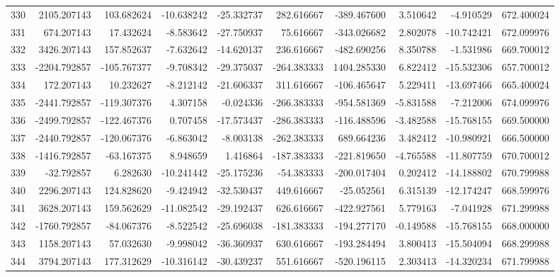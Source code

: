 \begin{tabular}{lrrrrrrrrr}
330 &   2105.207143 &   103.682624 & -10.638242 & -25.332737 &   282.616667 &  -389.467600 &   3.510642 &  -4.910529 &  672.400024 \\
331 &    674.207143 &    17.432624 &  -8.583642 & -27.750937 &    75.616667 &  -343.026682 &   2.802078 & -10.742421 &  672.099976 \\
332 &   3426.207143 &   157.852637 &  -7.632642 & -14.620137 &   236.616667 &  -482.690256 &   8.350788 &  -1.531986 &  669.700012 \\
333 &  -2204.792857 &  -105.767377 &  -9.708342 & -29.375037 &  -264.383333 &  1404.285330 &   6.822412 & -15.532306 &  657.700012 \\
334 &    172.207143 &    10.232627 &  -8.212142 & -21.606337 &   311.616667 &  -106.465647 &   5.229411 & -13.697466 &  665.400024 \\
335 &  -2441.792857 &  -119.307376 &   4.307158 &  -0.024336 &  -266.383333 &  -954.581369 &  -5.831588 &  -7.212006 &  674.099976 \\
336 &  -2499.792857 &  -122.467376 &   0.707458 & -17.573437 &  -286.383333 &  -116.488596 &  -3.482588 & -15.768155 &  669.500000 \\
337 &  -2440.792857 &  -120.067376 &  -6.863042 &  -8.003138 &  -262.383333 &   689.664236 &   3.482412 & -10.980921 &  666.500000 \\
338 &  -1416.792857 &   -63.167375 &   8.948659 &   1.416864 &  -187.383333 &  -221.819650 &  -4.765588 & -11.807759 &  670.700012 \\
339 &    -32.792857 &     6.282630 & -10.241442 & -25.175236 &   -54.383333 &  -200.017404 &   0.202412 & -14.188802 &  670.799988 \\
340 &   2296.207143 &   124.828620 &  -9.424942 & -32.530437 &   449.616667 &   -25.052561 &   6.315139 & -12.174247 &  668.599976 \\
341 &   3628.207143 &   159.562629 & -11.082542 & -29.192437 &   626.616667 &  -422.927561 &   5.779163 &  -7.041928 &  671.299988 \\
342 &  -1760.792857 &   -84.067376 &  -8.522542 & -25.696038 &  -181.383333 &  -194.277170 &  -0.149588 & -15.768155 &  668.000000 \\
343 &   1158.207143 &    57.032630 &  -9.998042 & -36.360937 &   630.616667 &  -193.284494 &   3.800413 & -15.504094 &  668.299988 \\
344 &   3794.207143 &   177.312629 & -10.316142 & -30.439237 &   551.616667 &  -520.196115 &   2.303413 & -14.320234 &  671.799988 \\

\end{tabular}
